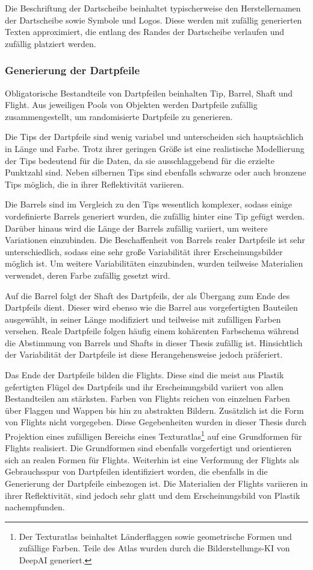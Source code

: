 Die Beschriftung der Dartscheibe beinhaltet typischerweise den Herstellernamen der Dartscheibe sowie Symbole und Logos. Diese werden mit zufällig generierten Texten approximiert, die entlang des Randes der Dartscheibe verlaufen und zufällig platziert werden.

\subsubsection{Generierung der Dartpfeile}

Obligatorische Bestandteile von Dartpfeilen beinhalten Tip, Barrel, Shaft und Flight. Aus jeweiligen Pools von Objekten werden Dartpfeile zufällig zusammengestellt, um randomisierte Dartpfeile zu generieren.

Die Tips der Dartpfeile sind wenig variabel und unterscheiden sich hauptsächlich in Länge und Farbe. Trotz ihrer geringen Größe ist eine realistische Modellierung der Tips bedeutend für die Daten, da sie ausschlaggebend für die erzielte Punktzahl sind. Neben silbernen Tips sind ebenfalls schwarze oder auch bronzene Tips möglich, die in ihrer Reflektivität variieren.

Die Barrels sind im Vergleich zu den Tips wesentlich komplexer, sodass einige vordefinierte Barrels generiert wurden, die zufällig hinter eine Tip gefügt werden. Darüber hinaus wird die Länge der Barrels zufällig variiert, um weitere Variationen einzubinden. Die Beschaffenheit von Barrels realer Dartpfeile ist sehr unterschiedlich, sodass eine sehr große Variabilität ihrer Erscheinungsbilder möglich ist. Um weitere Variabilitäten einzubinden, wurden teilweise Materialien verwendet, deren Farbe zufällig gesetzt wird.

Auf die Barrel folgt der Shaft des Dartpfeils, der als Übergang zum Ende des Dartpfeils dient. Dieser wird ebenso wie die Barrel aus vorgefertigten Bauteilen ausgewählt, in seiner Länge modifiziert und teilweise mit zufälligen Farben versehen. Reale Dartpfeile folgen häufig einem kohärenten Farbschema während die Abstimmung von Barrels und Shafts in dieser Thesis zufällig ist. Hinsichtlich der Variabilität der Dartpfeile ist diese Herangehensweise jedoch präferiert.

Das Ende der Dartpfeile bilden die Flights. Diese sind die meist aus Plastik gefertigten Flügel des Dartpfeils und ihr Erscheinungsbild variiert von allen Bestandteilen am stärksten. Farben von Flights reichen von einzelnen Farben über Flaggen und Wappen bis hin zu abstrakten Bildern. Zusätzlich ist die Form von Flights nicht vorgegeben. Diese Gegebenheiten wurden in dieser Thesis durch Projektion eines zufälligen Bereichs eines Texturatlas\footnote{Der Texturatlas beinhaltet Länderflaggen sowie geometrische Formen und zufällige Farben. Teile des Atlas wurden durch die Bilderstellungs-KI von DeepAI \cite{deepai-image} generiert.} auf eine Grundformen für Flights realisiert. Die Grundformen sind ebenfalls vorgefertigt und orientieren sich an realen Formen für Flights. Weiterhin ist eine Verformung der Flights als Gebrauchsspur von Dartpfeilen identifiziert worden, die ebenfalls in die Generierung der Dartpfeile einbezogen ist. Die Materialien der Flights variieren in ihrer Reflektivität, sind jedoch sehr glatt und dem Erscheinungsbild von Plastik nachempfunden.

